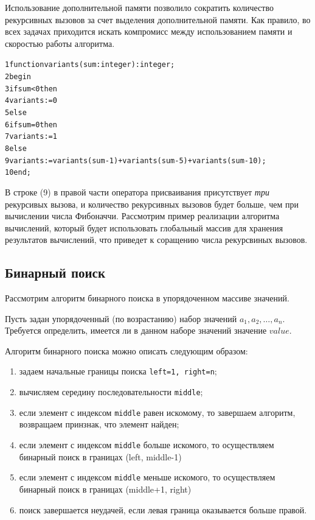 \documentclass[12pt,a4paper]{article}
\begin{document}
Использование дополнительной памяти позволило сократить количество рекурсивных вызовов за счет выделения дополнительной памяти. Как правило, во всех задачах приходится искать компромисс между использованием памяти и скоростью работы алгоритма.

\begin{alltt}
	1	function variants(sum: integer):integer;
	2	begin
	3	  if sum < 0 then
	4	    variants := 0
	5	else
	6	    if sum = 0 then
	7	      variants := 1
	8	    else
	9	      variants := variants(sum-1) + variants(sum-5) + variants(sum-10);
	10	end;
\end{alltt}

В строке (9) в правой части оператора присваивания присутствует \textit{три} рекурсивых вызова, и количество рекурсивных вызовов будет больше, чем при вычислении числа Фибоначчи. Рассмотрим пример реализации алгоритма вычислений, который будет использовать глобальный массив для хранения результатов вычислений, что приведет к соращению числа рекурсвиных вызовов. 

\subsection{Бинарный поиск}

Рассмотрим алгоритм бинарного поиска в упорядоченном массиве значений.

\begin{tcolorbox}
	Пусть задан упорядоченный (по возрастанию) набор значений $a_1, a_2, \dots, a_n$. Требуется определить, имеется ли в данном наборе значений значение $value$.
\end{tcolorbox}

Алгоритм бинарного поиска можно описать следующим образом:
\begin{enumerate}
	\item задаем начальные границы поиска \texttt{left=1, right=n}; 
	\item вычисляем середину последовательности \texttt{middle};  
	\item если элемент с индексом \texttt{middle} равен искомому, то завершаем алгоритм, возвращаем принзнак, что элемент найден;
	\item если элемент 	с индексом \texttt{middle} больше искомого, то осуществляем бинарный поиск в границах (left, middle-1)
	\item если элемент 	с индексом \texttt{middle} меньше искомого, то осуществляем бинарный поиск в границах (middle+1, right)	
	\item поиск завершается неудачей, если левая граница оказывается больше правой.		
\end{enumerate}
\end{document}
